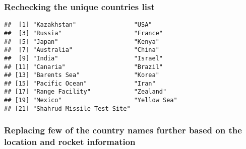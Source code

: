 \documentclass[
]{article}
\newenvironment{Shaded}{\begin{snugshade}}{\end{snugshade}}
\newcommand{\FunctionTok}[1]{\textcolor[rgb]{0.13,0.29,0.53}{\textbf{#1}}}
\newcommand{\NormalTok}[1]{#1}
\newcommand{\SpecialCharTok}[1]{\textcolor[rgb]{0.81,0.36,0.00}{\textbf{#1}}}
\begin{document}
\hypertarget{rechecking-the-unique-countries-list}{%
\subsubsection{Rechecking the unique countries
list}\label{rechecking-the-unique-countries-list}}

\begin{Shaded}
\end{Shaded}

\begin{verbatim}
##  [1] "Kazakhstan"                "USA"                      
##  [3] "Russia"                    "France"                   
##  [5] "Japan"                     "Kenya"                    
##  [7] "Australia"                 "China"                    
##  [9] "India"                     "Israel"                   
## [11] "Canaria"                   "Brazil"                   
## [13] "Barents Sea"               "Korea"                    
## [15] "Pacific Ocean"             "Iran"                     
## [17] "Range Facility"            "Zealand"                  
## [19] "Mexico"                    "Yellow Sea"               
## [21] "Shahrud Missile Test Site"
\end{verbatim}

\hypertarget{replacing-few-of-the-country-names-further-based-on-the-location-and-rocket-information}{%
\subsubsection{Replacing few of the country names further based on the
location and rocket
information}\label{replacing-few-of-the-country-names-further-based-on-the-location-and-rocket-information}}
\end{document}
